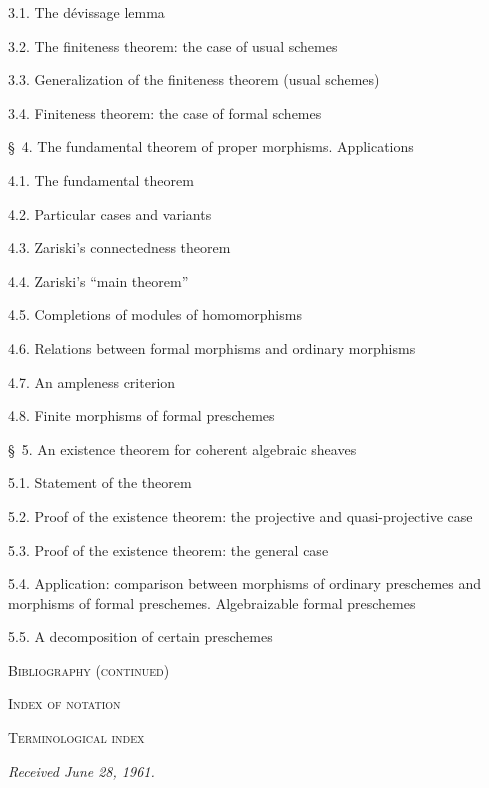 \documentclass[oneside]{amsart}
\theoremstyle{ega-env-style}
\theoremstyle{ega-thm-env-style}
\theoremstyle{ega-defn-env-style}
\newcommand{\oldpage}[2][]{{\marginnote{\normalfont{\textbf{#1}~|~#2}}}\ignorespaces}
\begin{document}
\begin{flushleft}
3.1. The dévissage lemma 

3.2. The finiteness theorem: the case of usual schemes 

3.3. Generalization of the finiteness theorem (usual schemes) 

3.4. Finiteness theorem: the case of formal schemes 

\medskip
\S~4. The fundamental theorem of proper morphisms. Applications 

4.1. The fundamental theorem 

4.2. Particular cases and variants 

4.3. Zariski's connectedness theorem 

4.4. Zariski's ``main theorem'' 

4.5. Completions of modules of homomorphisms 

4.6. Relations between formal morphisms and ordinary morphisms 

4.7. An ampleness criterion 

4.8. Finite morphisms of formal preschemes 

\oldpage[III]{167}

\S~5. An existence theorem for coherent algebraic sheaves 

5.1. Statement of the theorem 

5.2. Proof of the existence theorem: the projective and quasi-projective case

5.3. Proof of the existence theorem: the general case 

5.4. Application: comparison between morphisms of ordinary preschemes and
morphisms of formal preschemes. Algebraizable formal preschemes 

5.5. A decomposition of certain preschemes 

\medskip
\textsc{Bibliography (continued)} 

\textsc{Index of notation} 

\textsc{Terminological index} 

\begin{flushright}
\emph{Received June 28, 1961.}
\end{flushright}
\end{flushleft}
 
\clearpage
{}
{}
\end{document}
